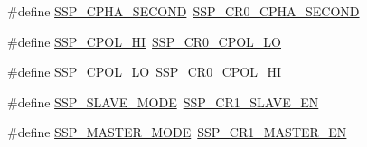 \begin{DoxyCompactItemize}
$$\item 
\#define \hyperlink{group___s_s_p__18_x_x__43_x_x_ga04ad38295445819979f55503eed5c177}{S\+S\+P\+\_\+\+C\+P\+H\+A\+\_\+\+S\+E\+C\+O\+ND}~\hyperlink{group___s_s_p__18_x_x__43_x_x_gae4150d0b2513ff70568be15c2170c9ea}{S\+S\+P\+\_\+\+C\+R0\+\_\+\+C\+P\+H\+A\+\_\+\+S\+E\+C\+O\+ND}
\item 
\#define \hyperlink{group___s_s_p__18_x_x__43_x_x_gaf64aec37a92ca6c14c23af6fc0052ccb}{S\+S\+P\+\_\+\+C\+P\+O\+L\+\_\+\+HI}~\hyperlink{group___s_s_p__18_x_x__43_x_x_gab4353fed07ef845a3796e154397f7e76}{S\+S\+P\+\_\+\+C\+R0\+\_\+\+C\+P\+O\+L\+\_\+\+LO}
\item 
\#define \hyperlink{group___s_s_p__18_x_x__43_x_x_ga1e10eccdb2b293607764028aab1b98a9}{S\+S\+P\+\_\+\+C\+P\+O\+L\+\_\+\+LO}~\hyperlink{group___s_s_p__18_x_x__43_x_x_ga36d7ad75edb14d318d710f964384f466}{S\+S\+P\+\_\+\+C\+R0\+\_\+\+C\+P\+O\+L\+\_\+\+HI}
\item 
\#define \hyperlink{group___s_s_p__18_x_x__43_x_x_gac6bc4b92810caa934b2d7116390098c6}{S\+S\+P\+\_\+\+S\+L\+A\+V\+E\+\_\+\+M\+O\+DE}~\hyperlink{group___s_s_p__18_x_x__43_x_x_ga483d570ffc25bc917c99b3e8ece75649}{S\+S\+P\+\_\+\+C\+R1\+\_\+\+S\+L\+A\+V\+E\+\_\+\+EN}
\item 
\#define \hyperlink{group___s_s_p__18_x_x__43_x_x_ga3c9cbd4f4b8169253d26f4d40cdc414d}{S\+S\+P\+\_\+\+M\+A\+S\+T\+E\+R\+\_\+\+M\+O\+DE}~\hyperlink{group___s_s_p__18_x_x__43_x_x_gaa8e064b00be6db00e597ad2509a633c3}{S\+S\+P\+\_\+\+C\+R1\+\_\+\+M\+A\+S\+T\+E\+R\+\_\+\+EN}
\end{DoxyCompactItemize}
